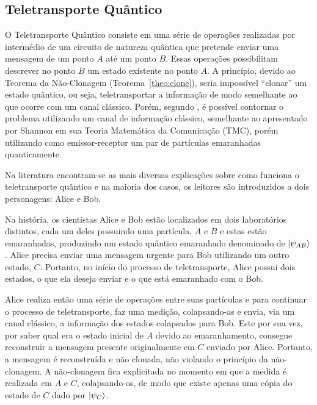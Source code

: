 \subsection{Teletransporte Quântico}\label{sec:teletransporteteoria}

O Teletransporte Quântico consiste em uma série de operações realizadas por intermédio de um circuito de natureza quântica que pretende enviar uma mensagem de um ponto \(A\) até um ponto \(B\). Essas operações possibilitam descrever no ponto \(B\) um estado existente no ponto \(A\). A princípio, devido ao Teorema da Não-Clonagem (Teorema~\ref{theo:clone}), seria impossível ``clonar'' um estado quântico, ou seja, teletransportar a informação de modo semelhante ao que ocorre com um canal clássico. Porém, segundo \textcite{bennet}, é possível contornar o problema utilizando um canal de informação clássico, semelhante ao apresentado por Shannon em sua Teoria Matemática da Comunicação (TMC), porém utilizando como emissor-receptor um par de partículas emaranhadas quanticamente.

Na literatura encontram-se as mais diversas explicações sobre como funciona o teletransporte quântico \cites{bennet}{experimentalqt}{zeilinger}{brassard1996teleportation}{materialdidaticomecquantica} e na maioria dos casos, os leitores são introduzidos a dois personagens: Alice e Bob.

Na história, os cientistas Alice e Bob estão localizados em dois laboratórios distintos, cada um deles possuindo uma partícula, $A$ e $B$ e estas estão emaranhadas, produzindo um estado quântico emaranhado denominado de $\ket{\psi_{AB}}$. Alice precisa enviar uma mensagem urgente para Bob utilizando um outro estado, $C$. Portanto, no início do processo de teletransporte, Alice possui dois estados, o que ela deseja enviar e o que está emaranhado com o Bob.

Alice realiza então uma série de operações entre suas partículas e para continuar o processo de teletransporte, faz uma medição, colapsando-as e envia, via um canal clássico, a informação dos estados colapsados para Bob. Este por sua vez, por saber qual era o estado inicial de $A$ devido ao emaranhamento, consegue reconstruir a mensagem presente originalmente em $C$ enviado por Alice. Portanto, a mensagem é reconstruída e não clonada, não violando o princípio da não-clonagem. A não-clonagem fica explicitada no momento em que a medida é realizada em $A$ e $C$, colapsando-os, de modo que existe apenas uma cópia do estado de $C$ dado por $\ket{\psi_{C}}$.


